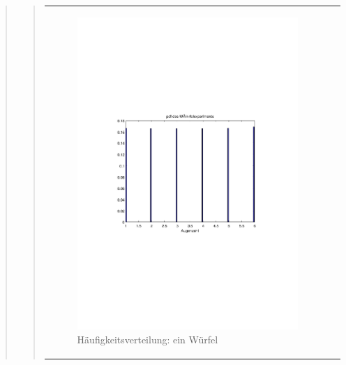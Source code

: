 \begin{quote}
\begin{quote}
\begin{center}
\begin{tabular}{ll}
\begin{minipage}{0.6\textwidth}
                \begin{figure}[H]
                    \label{fig:funktion0alpha}
                    \includegraphics[scale=0.7, trim = 20mm 80mm 20mm 90mm, clip]{Bilder/fairer_wuerfel}
                    \caption{Häufigkeitsverteilung: ein Würfel}
                \end{figure}
        
            \end{minipage}
        

\end{tabular}
\end{center}
\end{quote}
\end{quote}
